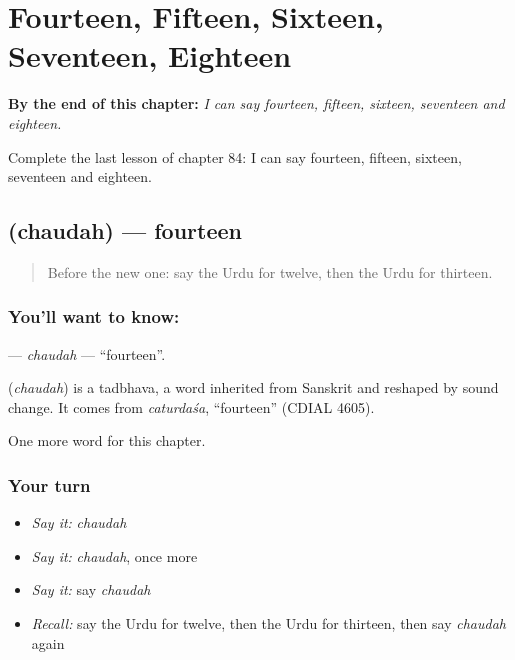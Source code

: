 
\chapter{Fourteen, Fifteen, Sixteen, Seventeen, Eighteen}
\label{ch:ur-fourteen-fifteen-sixteen-seventeen-eighteen}

\begin{chapteropening}
\textbf{By the end of this chapter:} \emph{I can say fourteen, fifteen, sixteen, seventeen and eighteen.}

Complete the last lesson of chapter 84: I can say fourteen, fifteen, sixteen, seventeen and eighteen.
\end{chapteropening}

\section[\texorpdfstring{\ur{چودہ} (chaudah)}{چودہ (chaudah)}]{ (chaudah) — fourteen}

\label{lesson:UR-C84-chaudah}



\begin{quote}
Before the new one: say the Urdu for twelve, then the Urdu for thirteen.
\end{quote}

\subsection*{You'll want to know: }
\textbf{} — \emph{chaudah} — \textquotedblleft{}fourteen\textquotedblright{}.

\begin{cousinweb}
\textbf{} (\emph{chaudah}) is a tadbhava, a word inherited from Sanskrit and reshaped by sound change. It comes from \emph{caturdaśa}, \textquotedblleft{}fourteen\textquotedblright{} (CDIAL 4605).
\end{cousinweb}

\begin{grammarlens}[title={What you've built}]
One more word for this chapter.
\end{grammarlens}

\subsection*{Your turn}
\begin{itemize}
\raggedright
  \item \emph{Say it:} \emph{chaudah}
  \item \emph{Say it:} \emph{chaudah}, once more
  \item \emph{Say it:} say \emph{chaudah}
  \item \emph{Recall:} say the Urdu for twelve, then the Urdu for thirteen, then say \emph{chaudah} again
\end{itemize}

